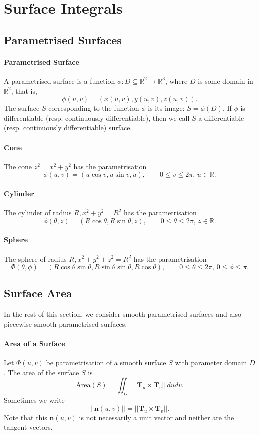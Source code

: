 \section{Surface Integrals}
\subsection{Parametrised Surfaces}
\paragraph{Parametrised Surface}
A parametrised surface is a function \(\phi: D \subseteq \mathbb R^2 \to \mathbb R^3\), where \(D\) is some domain in \(\mathbb R^2\), that is,
\[\phi (u,v) = (x(u,v), y(u,v), z(u,v)).\]
The surface \(S\) corresponding to the function \(\phi\) is its image: \(S = \phi(D)\). If \(\phi\) is differentiable (resp. continuously differentiable), then we call \(S\) a differentiable (resp. continuously differentiable) surface.

\paragraph{Cone}
The cone \(z^2 = x^2 + y^2\) has the parametrisation 
\[\phi(u,v) = (u\cos v, u\sin v, u), \qquad 0 \leq v \leq 2\pi, \, u \in \mathbb R.\]

\paragraph{Cylinder}
The cylinder of radius \(R, x^2 + y^2 = R^2\) has the parametrisation
\[\phi(\theta, z) = (R\cos\theta, R\sin\theta, z), \qquad 0\leq\theta\leq 2\pi, \, z\in\mathbb R.\]

\paragraph{Sphere}
The sphere of radius \(R, x^2 + y^2 + z^2 = R^2\) has the parametrisation
\[\Phi(\theta,\phi) = (R\cos\theta\sin\theta, R\sin\theta\sin\theta, R\cos\theta), \qquad 0 \leq \theta \leq 2\pi, \, 0 \leq \phi \leq \pi.\]

\subsection{Surface Area}
In the rest of this section, we consider smooth parametrised surfaces and also piecewise smooth parametrised surfaces.

\paragraph{Area of a Surface}
Let \(\Phi(u,v)\) be parametrisation of a smooth surface \(S\) with parameter domain \(D\). The area of the surface \(S\) is
\[\text{Area}(S) = \iint_D ||\textbf{T}_u \times \textbf{T}_v|| \, dudv.\]
Sometimes we write
\[||\textbf{n}(u,v)|| = ||\textbf{T}_u \times \textbf{T}_v||.\]
Note that this \(\textbf{n}(u,v)\) is not necessarily a unit vector and neither are the tangent vectors.

